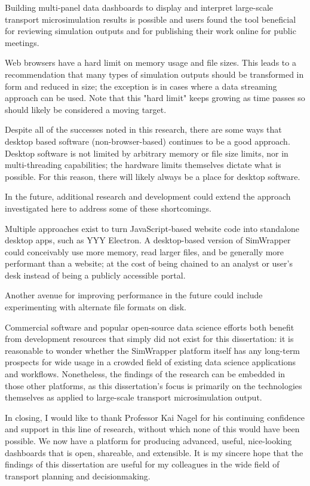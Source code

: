 Building multi-panel data dashboards to display and interpret large-scale transport microsimulation results is possible and users found the tool beneficial for reviewing simulation outputs and for publishing their work online for public meetings.

Web browsers have a hard limit on memory usage and file sizes. This leads to a recommendation that many types of simulation outputs should be transformed in form and reduced in size; the exception is in cases where a data streaming approach can be used. Note that this "hard limit" keeps growing as time passes so should likely be considered a moving target.

Despite all of the successes noted in this research, there are some ways that desktop based software (non-browser-based) continues to be a good approach. Desktop software is not limited by arbitrary memory or file size limits, nor in multi-threading capabilities; the hardware limits themselves dictate what is possible. For this reason, there will likely always be a place for desktop software.

In the future, additional research and development could extend the approach investigated here to address some of these shortcomings.

Multiple approaches exist to turn JavaScript-based website code into standalone desktop apps, such as YYY Electron. A desktop-based version of SimWrapper could conceivably use more memory, read larger files, and be generally more performant than a website; at the cost of being chained to an analyst or user's desk instead of being a publicly accessible portal.

Another avenue for improving performance in the future could include experimenting with alternate file formats on disk.

Commercial software and popular open-source data science efforts both benefit from development resources that simply did not exist for this dissertation: it is reasonable to wonder whether the SimWrapper platform itself has any long-term prospects for wide usage in a crowded field of existing data science applications and workflows. Nonetheless, the findings of the research can be embedded in those other platforms, as this dissertation's focus is primarily on the technologies themselves as applied to large-scale transport microsimulation output.

In closing, I would like to thank Professor Kai Nagel for his continuing confidence and support in this line of research, without which none of this would have been possible. We now have a platform for producing advanced, useful, nice-looking dashboards that is open, shareable, and extensible. It is my sincere hope that the findings of this dissertation are useful for my colleagues in the wide field of transport planning and decisionmaking.


